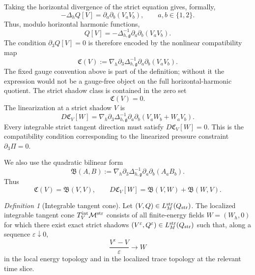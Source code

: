 \documentclass[11pt]{article}
\numberwithin{equation}{section}
\theoremstyle{plain}
\theoremstyle{definition}
\theoremstyle{remark}
\newtheorem{definition}{Definition}[section]
\newcommand{\str}{\mathrm{str}}
\begin{document}
Taking the horizontal divergence of the strict equation gives, formally,
\begin{equation}\label{pII:eq:strict-pressure-horizontal}
        -\Delta_h Q[V]
        =\partial_a\partial_b(V_aV_b),
        \qquad a,b\in\{1,2\}.
\end{equation}
Thus, modulo horizontal harmonic functions,
\[
        Q[V]=-\Delta_{h,\mathfrak g}^{-1}\partial_a\partial_b(V_aV_b).
\]
The condition $\partial_3Q[V]=0$ is therefore encoded by the nonlinear compatibility map
\begin{equation}\label{pII:eq:compatibility-map}
        \mathfrak C(V)
        :=\nabla_h\partial_3\Delta_{h,\mathfrak g}^{-1}\partial_a\partial_b(V_aV_b).
\end{equation}
The fixed gauge convention above is part of the definition; without it the expression would not be a gauge-free object on the full horizontal-harmonic quotient.  The strict shadow class is contained in the zero set
\begin{equation}\label{pII:eq:strict-zero-set}
        \mathfrak C(V)=0.
\end{equation}
The linearization at a strict shadow $V$ is
\begin{equation}\label{pII:eq:linearized-compatibility-map}
        D\mathfrak C_V[W]
        =\nabla_h\partial_3\Delta_{h,\mathfrak g}^{-1}
        \partial_a\partial_b(V_aW_b+W_aV_b).
\end{equation}
Every integrable strict tangent direction must satisfy $D\mathfrak C_V[W]=0$.  This is the compatibility condition corresponding to the linearized pressure constraint $\partial_3\Pi=0$.

We also use the quadratic bilinear form
\begin{equation}\label{pII:eq:quadratic-compatibility-map}
        \mathfrak B(A,B)
        :=\nabla_h\partial_3\Delta_{h,\mathfrak g}^{-1}\partial_a\partial_b(A_aB_b).
\end{equation}
Thus
\[
        \mathfrak C(V)=\mathfrak B(V,V),
        \qquad
        D\mathfrak C_V[W]=\mathfrak B(V,W)+\mathfrak B(W,V).
\]

\begin{definition}[Integrable tangent cone]\label{pII:def:integrable-tangent-cone}
Let $(V,Q)\in L_M^{\str}(Q_{\rm str})$.  The localized integrable tangent cone $T^{\rm int}_V\mathcal M^{\str}$ consists of all finite-energy fields $W=(W_h,0)$ for which there exist exact strict shadows $(V^\varepsilon,Q^\varepsilon)\in L_M^{\str}(Q_{\rm str})$ such that, along a sequence $\varepsilon\downarrow0$,
\begin{equation}\label{pII:eq:integrable-cone-definition}
        \frac{V^\varepsilon-V}{\varepsilon}\to W
\end{equation}
in the local energy topology and in the localized trace topology at the relevant time slice.
\end{definition}
\end{document}
